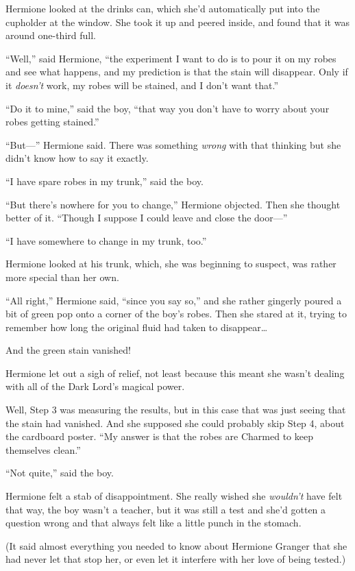 Hermione looked at the drinks can, which she'd automatically put into
the cupholder at the window. She took it up and peered inside, and found
that it was around one-third full.

``Well,'' said Hermione, ``the experiment I want to do is to pour it on
my robes and see what happens, and my prediction is that the stain will
disappear. Only if it \emph{doesn't} work, my robes will be stained, and
I don't want that.''

``Do it to mine,'' said the boy, ``that way you don't have to worry
about your robes getting stained.''

``But---'' Hermione said. There was something \emph{wrong} with that
thinking but she didn't know how to say it exactly.

``I have spare robes in my trunk,'' said the boy.

``But there's nowhere for you to change,'' Hermione objected. Then she
thought better of it. ``Though I suppose I could leave and close the
door---''

``I have somewhere to change in my trunk, too.''

Hermione looked at his trunk, which, she was beginning to suspect, was
rather more special than her own.

``All right,'' Hermione said, ``since you say so,'' and she rather
gingerly poured a bit of green pop onto a corner of the boy's robes.
Then she stared at it, trying to remember how long the original fluid
had taken to disappear\ldots{}

And the green stain vanished!

Hermione let out a sigh of relief, not least because this meant she
wasn't dealing with all of the Dark Lord's magical power.

Well, Step 3 was measuring the results, but in this case that was just
seeing that the stain had vanished. And she supposed she could probably
skip Step 4, about the cardboard poster. ``My answer is that the robes
are Charmed to keep themselves clean.''

``Not quite,'' said the boy.

Hermione felt a stab of disappointment. She really wished she
\emph{wouldn't} have felt that way, the boy wasn't a teacher, but it was
still a test and she'd gotten a question wrong and that always felt like
a little punch in the stomach.

(It said almost everything you needed to know about Hermione Granger
that she had never let that stop her, or even let it interfere with her
love of being tested.)

